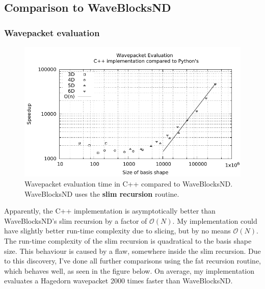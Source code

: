 \documentclass{article}
\begin{document}
\subsection{Comparison to WaveBlocksND}

\subsubsection{Wavepacket evaluation}

\begin{figure}[H]
  \centering
  \includegraphics[width=1.0\textwidth]{plots/hawp_eval_cvp_slim}
  \caption{Wavepacket evaluation time in C++ compared to WaveBlocksND.
    WaveBlocksND uses the \textbf{slim recursion} routine.}
  \label{fig:hawp_eval_cvp_slim}
\end{figure}

Apparently, the C++ implementation is asymptotically better than
WaveBlocksND's slim recursion by a factor of \(\mathcal{O}(N)\).
My implementation could have slightly better run-time complexity due to slicing, but by
no means \(\mathcal{O}(N)\). The run-time complexity of the slim recursion is
quadratical to the basis shape size.
This behaviour is caused by a flaw, somewhere inside the slim recursion.
Due to this discovery, I've done all further comparisons using the fat recursion routine,
which behaves well, as seen in the figure below. On average, my implementation evaluates a
Hagedorn wavepacket 2000 times faster than WaveBlocksND.
\end{document}

